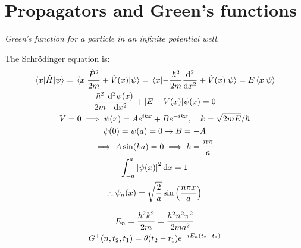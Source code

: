 \documentclass{report}
\begin{document}
\chapter{Propagators and Green's functions}
\begin{subquests}
	\item \emph{Green's function for a particle in an infinite potential well.}
	\begin{subquests}
		\item The Schr\"odinger equation is:
		\begin{gather*}
			\mel{x}{\hat H}{\psi} = \mel{x}{\frac{\hat P^2}{2m} + \hat V(x)}{\psi} = \mel{x}{-\frac{\hbar^2}{2m}\dv[2]{x} + \hat V(x)}{\psi} = E\braket{x}{\psi}\\
			\frac{\hbar^2}{2m}\dv[2]{\psi(x)}{x} + \bqty{E- V(x)}\psi(x) = 0\\
			V = 0 \implies \psi(x) = Ae^{ikx} + Be^{-ikx},\quad k = \sqrt{2mE}/\hbar \\
			\psi(0) = \psi(a) = 0 \rightarrow B = -A \\
			\implies A \sin(ka) = 0 \implies k = \frac{n\pi}{a}\\
			\int_{-a}^{a} \abs{\psi(x)}^2 \dd{x} = 1 \\
			\therefore \psi_n(x) = \sqrt{\frac{2}{a}}\sin\pqty{\frac{n\pi x}{a}}
		\end{gather*}

		\item
		\begin{gather*}
			E_n = \frac{\hbar^2k^2}{2m} = \frac{\hbar^2n^2\pi^2}{2ma^2} \\
			G^+(n,t_2,t_1) = \theta(t_2 - t_1)e^{-iE_n\pqty{t_2 - t_1}}
		\end{gather*}


\end{subquests}
\end{subquests}
\end{document}
